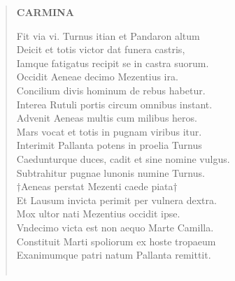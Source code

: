 \documentclass[11pt, a4paper]{report}
\begin{document}
\begin{verse}
    \begin{center} \textbf{CARMINA} \end{center} \marginpar{[14]} Fit via vi. Turnus itian et Pandaron altum \\ Deicit et totis victor dat funera castris, \\ Iamque fatigatus recipit se in castra suorum. \\ Occidit Aeneae decimo Mezentius ira. \\ Concilium divis hominum de rebus habetur. \\ Interea Rutuli portis circum omnibus instant. \\ Advenit Aeneas multis cum milibus heros. \\ Mars vocat et totis in pugnam viribus itur. \\ Interimit Pallanta potens in proelia Turnus \\ Caedunturque duces, cadit et sine nomine vulgus. \\ Subtrahitur pugnae lunonis numine Turnus. \\ †Aeneas perstat Mezenti caede piata† \\ Et Lausum invicta perimit per vulnera dextra. \\ Mox ultor nati Mezentius occidit ipse. \\ Vndecimo victa est non aequo Marte Camilla. \\ Constituit Marti spoliorum ex hoste tropaeum \\ Exanimumque patri natum Pallanta remittit. \\ 
        ﻿\pagebreak 

\end{verse}
\end{document}
